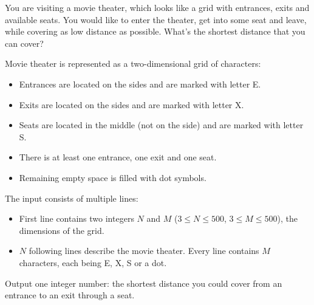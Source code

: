 \problemname{\problemyamlname}


\newcommand{\minn}{3}
\newcommand{\maxn}{500}
\newcommand{\minm}{3}
\newcommand{\maxm}{500}

You are visiting a movie theater, which looks like a grid with entrances, exits and available seats. You would like to enter the theater, get into some seat and leave, while covering as low distance as possible. What's the shortest distance that you can cover?

Movie theater is represented as a two-dimensional grid of characters:
\begin{itemize}
    \item Entrances are located on the sides and are marked with letter E.
    \item Exits are located on the sides and are marked with letter X.
    \item Seats are located in the middle (not on the side) and are marked with letter S.
    \item There is at least one entrance, one exit and one seat.
    \item Remaining empty space is filled with dot symbols.
\end{itemize}

\begin{Input}
    The input consists of multiple lines:
    \begin{itemize}
        \item First line contains two integers $N$ and $M$ ($\minn \leq N \leq \maxn$, $\minm \leq M \leq \maxm$), the dimensions of the grid.
        \item $N$ following lines describe the movie theater. Every line contains $M$ characters, each being E, X, S or a dot.
     \end{itemize}
\end{Input}

\begin{Output}
    Output one integer number: the shortest distance you could cover from an entrance to an exit through a seat.
\end{Output}
